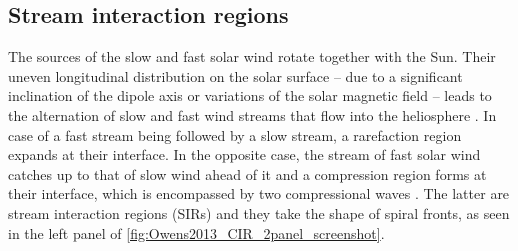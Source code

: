 \subsection{Stream interaction regions}
The sources of the slow and fast solar wind rotate together with the Sun. Their uneven longitudinal distribution on the solar surface -- due to a significant inclination of the dipole axis or variations of the solar magnetic field -- leads to the alternation of slow and fast wind streams that flow into the heliosphere \citep{Owens2013}.
In case of a fast stream being followed by a slow stream, a rarefaction region expands at their interface. In the opposite case, the stream of fast solar wind catches up to that of slow wind ahead of it and a compression region forms at their interface, which is encompassed by two compressional waves \citep{Balogh2009}. The latter are stream interaction regions (SIRs) and they take the shape of spiral fronts, as seen in the left panel of \autoref{fig:Owens2013_CIR_2panel_screenshot}.
\begin{figure}[htb]
\end{figure}

